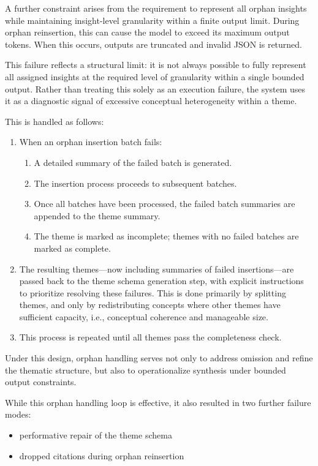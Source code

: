 \documentclass[
  11pt,
]{article}
\begin{document}
A further constraint arises from the requirement to represent all orphan
insights while maintaining insight-level granularity within a finite
output limit. During orphan reinsertion, this can cause the model to
exceed its maximum output tokens. When this occurs, outputs are
truncated and invalid JSON is returned.

This failure reflects a structural limit: it is not always possible to
fully represent all assigned insights at the required level of
granularity within a single bounded output. Rather than treating this
solely as an execution failure, the system uses it as a diagnostic
signal of excessive conceptual heterogeneity within a theme.

This is handled as follows:

\begin{enumerate}
\item When an orphan insertion batch fails:
  \begin{enumerate}
  \item A detailed summary of the failed batch is generated.
  \item The insertion process proceeds to subsequent batches.
  \item Once all batches have been processed, the failed batch summaries are appended to the theme summary.
  \item The theme is marked as incomplete; themes with no failed batches are marked as complete.
  \end{enumerate}

\item The resulting themes---now including summaries of failed insertions---are passed back to the theme 
schema generation step, with explicit instructions to prioritize resolving these failures. This is done 
primarily by splitting themes, and only by redistributing concepts where other themes have sufficient 
capacity, i.e., conceptual coherence and manageable size.

\item This process is repeated until all themes pass the completeness check.
\end{enumerate}

Under this design, orphan handling serves not only to address omission
and refine the thematic structure, but also to operationalize synthesis
under bounded output constraints.

While this orphan handling loop is effective, it also resulted in two 
further failure modes:
\begin{itemize}
  \item performative repair of the theme schema
  \item dropped citations during orphan reinsertion
\end{itemize}
\end{document}
